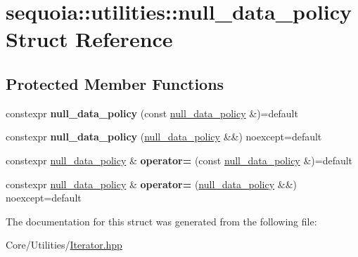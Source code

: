 \hypertarget{structsequoia_1_1utilities_1_1null__data__policy}{}\section{sequoia\+::utilities\+::null\+\_\+data\+\_\+policy Struct Reference}
\label{structsequoia_1_1utilities_1_1null__data__policy}
\subsection*{Protected Member Functions}
\begin{DoxyCompactItemize}
\item 
\mbox{\label{structsequoia_1_1utilities_1_1null__data__policy_ad866e1e84cf9bc4801c699fe0c00ac96}} 
constexpr {\bfseries null\+\_\+data\+\_\+policy} (const \mbox{\hyperlink{structsequoia_1_1utilities_1_1null__data__policy}{null\+\_\+data\+\_\+policy}} \&)=default
\item 
\mbox{\label{structsequoia_1_1utilities_1_1null__data__policy_aadca63e9e4320a05c9faa442243c4334}} 
constexpr {\bfseries null\+\_\+data\+\_\+policy} (\mbox{\hyperlink{structsequoia_1_1utilities_1_1null__data__policy}{null\+\_\+data\+\_\+policy}} \&\&) noexcept=default
\item 
\mbox{\label{structsequoia_1_1utilities_1_1null__data__policy_ad60bc0cca68b2876ca2b0b9ec01e2f3b}} 
constexpr \mbox{\hyperlink{structsequoia_1_1utilities_1_1null__data__policy}{null\+\_\+data\+\_\+policy}} \& {\bfseries operator=} (const \mbox{\hyperlink{structsequoia_1_1utilities_1_1null__data__policy}{null\+\_\+data\+\_\+policy}} \&)=default
\item 
\mbox{\label{structsequoia_1_1utilities_1_1null__data__policy_a9c8b0f82a89b567755153e31ca741210}} 
constexpr \mbox{\hyperlink{structsequoia_1_1utilities_1_1null__data__policy}{null\+\_\+data\+\_\+policy}} \& {\bfseries operator=} (\mbox{\hyperlink{structsequoia_1_1utilities_1_1null__data__policy}{null\+\_\+data\+\_\+policy}} \&\&) noexcept=default
\end{DoxyCompactItemize}


The documentation for this struct was generated from the following file\+:\begin{DoxyCompactItemize}
\item 
Core/\+Utilities/\mbox{\hyperlink{_iterator_8hpp}{Iterator.\+hpp}}\end{DoxyCompactItemize}
